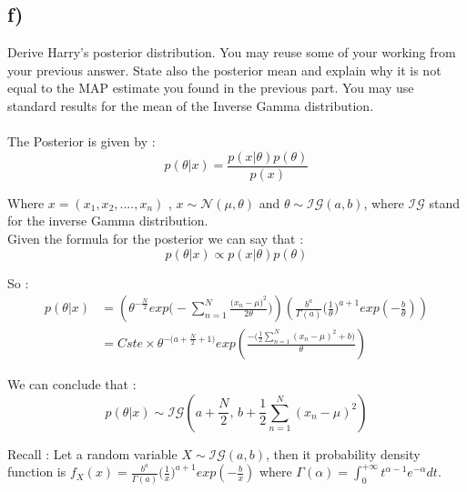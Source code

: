 \documentclass[12pt,twoside]{article}
\begin{document}
\subsection*{f)} Derive Harry's posterior distribution. You may reuse some of your working from your previous answer. State also the posterior mean and explain why it is not equal to the MAP estimate you found in the previous part. You may use standard results for the mean of the Inverse Gamma distribution.\\ \\

The Posterior is given by :
\begin{equation*}
p(\theta|x) = \frac{p(x|\theta)p(\theta)}{p(x)}
\end{equation*}

Where $x =(x_1,x_2,....,x_n)$ , $x \sim \mathcal{N}(\mu, \theta)$ and $\theta \sim \mathcal{IG}(a, b)$, where $\mathcal{IG}$ stand for the inverse Gamma distribution.\\

Given the formula for the posterior we can say that : 
\begin{equation*}
p(\theta|x) \propto p(x|\theta)p(\theta)
\end{equation*}

So :
\begin{align*}
p(\theta|x) &= \left(\theta^{-\frac{N}{2}} exp\big(- \sum_{n=1}^{N} \frac{\big(x_n - \mu\big)^2}{2\theta}\big)\right) \left(\frac{b^a}{\Gamma(a)} \big(\frac{1}{\theta}\big)^{a+1}exp(-\frac{b}{\theta}) \right) \\
            &= Cste \times \theta^{- \big(a + \frac{N}{2} + 1\big)} exp \left( \frac{-\big(\frac{1}{2} \sum_{n=1}^{N} (x_n - \mu)^2 + b\big)}{\theta} \right)
\end{align*}

We can conclude that : 
\begin{equation}
\boxed{p(\theta|x) \sim \mathcal{IG}\left(a+\frac{N}{2},  \,b + \frac{1}{2}\sum_{n=1}^{N} (x_n - \mu)^2\right)}
\end{equation}

Recall : Let a random variable $X \sim \mathcal{IG}(a, b)$, then it probability density function is $f_X(x) = \frac{b^a}{\Gamma(a)} \big(\frac{1}{x}\big)^{a+1}exp(-\frac{b}{x})$ where $\Gamma(\alpha) = \int_{0}^{+\infty} t^{\alpha - 1} e^{-\alpha} dt$.\\ \\
\end{document}
